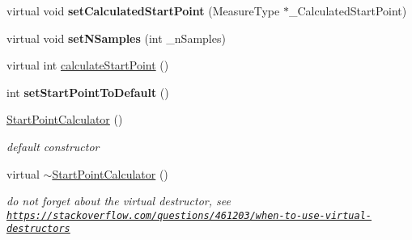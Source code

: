 \begin{DoxyCompactItemize}
\item 
\hypertarget{class_ox_1_1_start_point_calculator_aebb0511e802eff920369dec99b6c00fb}{virtual void {\bfseries set\-Calculated\-Start\-Point} (Measure\-Type $\ast$\-\_\-\-Calculated\-Start\-Point)}\label{class_ox_1_1_start_point_calculator_aebb0511e802eff920369dec99b6c00fb}

\item 
\hypertarget{class_ox_1_1_start_point_calculator_a72195ac7840734cd9001d0303ab859f4}{virtual void {\bfseries set\-N\-Samples} (int \-\_\-n\-Samples)}\label{class_ox_1_1_start_point_calculator_a72195ac7840734cd9001d0303ab859f4}

\item 
virtual int \hyperlink{class_ox_1_1_start_point_calculator_acd8fda33c7bf92f02e0915e9a900692d}{calculate\-Start\-Point} ()
\item 
\hypertarget{class_ox_1_1_start_point_calculator_ae8ddca43560e04c7332f804a825ee525}{int {\bfseries set\-Start\-Point\-To\-Default} ()}\label{class_ox_1_1_start_point_calculator_ae8ddca43560e04c7332f804a825ee525}

\item 
\hypertarget{class_ox_1_1_start_point_calculator_a408ce85b6fbf0ee69f4eca3176b814d6}{\hyperlink{class_ox_1_1_start_point_calculator_a408ce85b6fbf0ee69f4eca3176b814d6}{Start\-Point\-Calculator} ()}\label{class_ox_1_1_start_point_calculator_a408ce85b6fbf0ee69f4eca3176b814d6}

\begin{DoxyCompactList}\small\item\em default constructor \end{DoxyCompactList}\item 
\hypertarget{class_ox_1_1_start_point_calculator_a210c3312a8926b750dba8e498c6b620a}{virtual \hyperlink{class_ox_1_1_start_point_calculator_a210c3312a8926b750dba8e498c6b620a}{$\sim$\-Start\-Point\-Calculator} ()}\label{class_ox_1_1_start_point_calculator_a210c3312a8926b750dba8e498c6b620a}

\begin{DoxyCompactList}\small\item\em do not forget about the virtual destructor, see \href{https://stackoverflow.com/questions/461203/when-to-use-virtual-destructors}{\tt https\-://stackoverflow.\-com/questions/461203/when-\/to-\/use-\/virtual-\/destructors} \end{DoxyCompactList}\end{DoxyCompactItemize}
